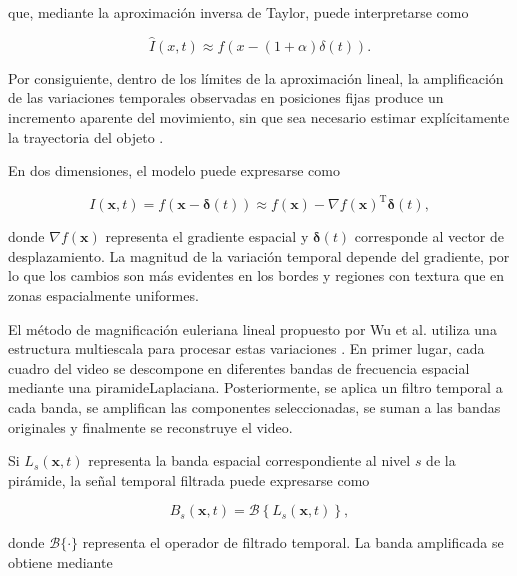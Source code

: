 que, mediante la aproximación inversa de Taylor, puede interpretarse como

\begin{equation}
    \widehat{I}(x,t)
    \approx
    f\left(x-(1+\alpha)\delta(t)\right).
    \label{eq:equivalencia_desplazamiento}
\end{equation}

Por consiguiente, dentro de los límites de la aproximación lineal, la amplificación de las variaciones temporales observadas en posiciones fijas produce un incremento aparente del movimiento, sin que sea necesario estimar explícitamente la trayectoria del objeto \cite{wu2012eulerian}.

En dos dimensiones, el modelo puede expresarse como

\begin{equation}
    I(\mathbf{x},t)
    =
    f\left(\mathbf{x}-\boldsymbol{\delta}(t)\right)
    \approx
    f(\mathbf{x})
    -
    \nabla f(\mathbf{x})^{\mathrm{T}}
    \boldsymbol{\delta}(t),
    \label{eq:modelo_euleriano_bidimensional}
\end{equation}

donde $\nabla f(\mathbf{x})$ representa el gradiente espacial y $\boldsymbol{\delta}(t)$ corresponde al vector de desplazamiento. La magnitud de la variación temporal depende del gradiente, por lo que los cambios son más evidentes en los bordes y regiones con textura que en zonas espacialmente uniformes.

El método de magnificación euleriana lineal propuesto por Wu et al. utiliza una estructura multiescala para procesar estas variaciones \cite{wu2012eulerian}. En primer lugar, cada cuadro del video se descompone en diferentes bandas de frecuencia espacial mediante una \gls{piramideLaplaciana}. Posteriormente, se aplica un filtro temporal a cada banda, se amplifican las componentes seleccionadas, se suman a las bandas originales y finalmente se reconstruye el video.

Si $L_s(\mathbf{x},t)$ representa la banda espacial correspondiente al nivel $s$ de la pirámide, la señal temporal filtrada puede expresarse como

\begin{equation}
    B_s(\mathbf{x},t)
    =
    \mathcal{B}
    \left\{
        L_s(\mathbf{x},t)
    \right\},
    \label{eq:filtrado_temporal_multiescala}
\end{equation}

donde $\mathcal{B}\{\cdot\}$ representa el operador de filtrado temporal. La banda amplificada se obtiene mediante

